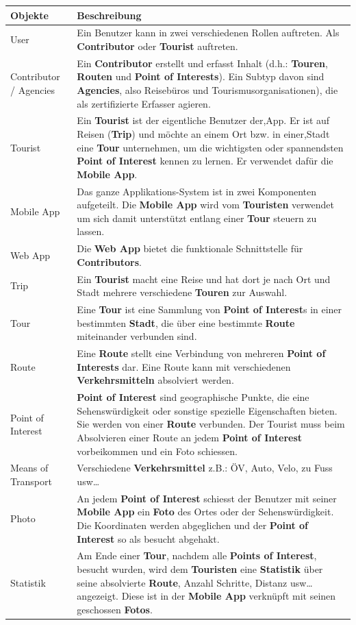 \documentclass[a4paper,10pt,xetex]{article}
\begin{document}
\begin{longtabu} to \textwidth { | l | X[l] | }
\hline
\textbf{Objekte} & \textbf{Beschreibung} \\\hline
\endhead

User & Ein Benutzer kann in zwei verschiedenen Rollen auftreten. Als \textbf{Contributor} oder \textbf{Tourist} auftreten.\\\hline
Contributor / Agencies & Ein \textbf{Contributor} erstellt und erfasst Inhalt (d.h.: \textbf{Touren}, \textbf{Routen} und \textbf{Point of Interests}). Ein Subtyp davon sind \textbf{Agencies}, also Reisebüros und Tourismusorganisationen), die als zertifizierte Erfasser agieren.\\\hline
Tourist & Ein \textbf{Tourist} ist der eigentliche Benutzer der,App. Er ist auf Reisen (\textbf{Trip}) und möchte an einem Ort bzw. in einer,Stadt eine \textbf{Tour} unternehmen, um die wichtigsten oder spannendsten \textbf{Point of Interest} kennen zu lernen. Er verwendet dafür die \textbf{Mobile App}.\\\hline
Mobile App & Das ganze Applikations-System ist in zwei Komponenten aufgeteilt. Die \textbf{Mobile App} wird vom \textbf{Touristen} verwendet um sich damit unterstützt entlang einer \textbf{Tour} steuern zu lassen.\\\hline
Web App & Die \textbf{Web App} bietet die funktionale Schnittstelle für \textbf{Contributors}.\\\hline
Trip & Ein \textbf{Tourist} macht eine Reise und hat dort je nach Ort und Stadt mehrere verschiedene \textbf{Touren} zur Auswahl.\\\hline
Tour & Eine \textbf{Tour} ist eine Sammlung von \textbf{Point of Interest}s in einer bestimmten \textbf{Stadt}, die über eine bestimmte \textbf{Route} miteinander verbunden sind.\\\hline
Route & Eine \textbf{Route} stellt eine Verbindung von mehreren \textbf{Point of Interests} dar. Eine Route kann mit verschiedenen \textbf{Verkehrsmitteln} absolviert werden.\\\hline
Point of Interest & \textbf{Point of Interest} sind geographische Punkte, die eine Sehenswürdigkeit oder sonstige spezielle Eigenschaften bieten. Sie werden von einer \textbf{Route} verbunden. Der Tourist muss beim Absolvieren einer Route an jedem \textbf{Point of Interest} vorbeikommen und ein Foto schiessen.\\\hline
Means of Transport & Verschiedene \textbf{Verkehrsmittel} z.B.: ÖV, Auto, Velo, zu Fuss usw\ldots{}\\\hline
Photo & An jedem \textbf{Point of Interest} schiesst der Benutzer mit seiner \textbf{Mobile App} ein \textbf{Foto} des Ortes oder der Sehenswürdigkeit. Die Koordinaten werden abgeglichen und der \textbf{Point of Interest} so als besucht abgehakt.\\\hline
Statistik & Am Ende einer \textbf{Tour}, nachdem alle \textbf{Points of Interest}, besucht wurden, wird dem \textbf{Touristen} eine \textbf{Statistik} über seine absolvierte \textbf{Route}, Anzahl Schritte, Distanz usw\ldots{} angezeigt. Diese ist in der \textbf{Mobile App} verknüpft mit seinen geschossen \textbf{Fotos}.\\\hline
\end{longtabu}
\end{document}
